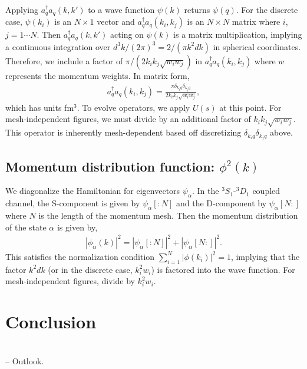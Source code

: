 \documentclass[preprintnumbers,floatfix,aps,prc,preprint,nofootinbib]{revtex4-1}
\begin{document}
Applying $a^{\dagger}_q a_q (k, k')$ to a wave function $\psi(k)$ returns $\psi(q)$. For the discrete case, $\psi(k_i)$ is an $N \times 1$ vector and $a^{\dagger}_q a_q (k_i, k_j)$ is an $N \times N$ matrix where $i$, $j=1\cdots N$. Then $a^{\dagger}_q a_q (k, k')$ acting on $\psi(k)$ is a matrix multiplication, implying a continuous integration over $d^3k / (2 \pi)^3 = 2 / (\pi k^2 dk)$ in spherical coordinates. Therefore, we include a factor of $\pi / (2 k_i k_j \sqrt{w_i w_j})$ in $a^{\dagger}_q a_q (k_i, k_j)$ where $w$ represents the momentum weights. In matrix form,
%
\begin{eqnarray}
	\label{eq:momentum_projection_operator}
	a^{\dagger}_q a_q (k_i, k_j) = \frac{\pi \delta_{k_i q} \delta_{k_j q}}{2 k_i k_j \sqrt{w_i w_j}},
\end{eqnarray}
%
which has units fm$^3$. To evolve operators, we apply $U(s)$ at this point. For mesh-independent figures, we must divide by an additional factor of $k_i k_j \sqrt{w_i w_j}$. This operator is inherently mesh-dependent based off discretizing $\delta_{k_i q} \delta_{k_j q}$ above.


\subsection{Momentum distribution function: $\phi^2(k)$}
\label{sec:momentum_dist_funcs}


We diagonalize the Hamiltonian for eigenvectors $\psi_{\alpha}$. In the $^{3}S_1$-$^{3}D_1$ coupled channel, the S-component is given by $\psi_{\alpha}[: \! N]$ and the D-component by $\psi_{\alpha}[N \! :]$ where $N$ is the length of the momentum mesh. Then the momentum distribution of the state $\alpha$ is given by,
%
\begin{eqnarray}
	\label{eq:momentum_distribution}
	|\phi_{\alpha}(k)|^2 = |\psi_{\alpha}[: \! N]|^2 + |\psi_{\alpha}[N \! :]|^2.
\end{eqnarray}
%
This satisfies the normalization condition $\sum_{i=1}^N |\phi(k_i)|^2 = 1$, implying that the factor $k^2 dk$ (or in the discrete case, $k_i^2 w_i$) is factored into the wave function. For mesh-independent figures, divide by $k_i^2 w_i$.


\section{Conclusion}
\label{sec:conclusion}


\\
-- Outlook.





\end{document}
